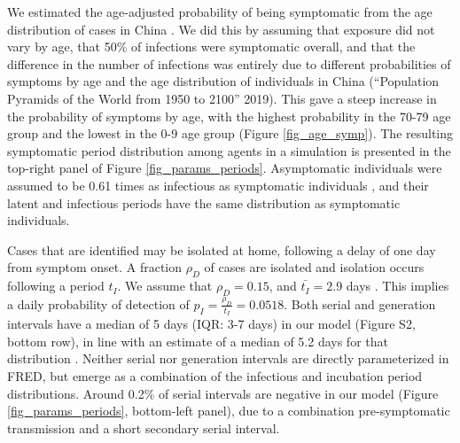 \documentclass[11pt]{article}
\begin{document}
We estimated the age-adjusted probability of being symptomatic from the age distribution of cases in China \cite{ChinaCDC2020_weekly}. We did this by assuming that exposure did not vary by age, that 50\% of infections were symptomatic overall, and that the difference in the number of infections was entirely due to different probabilities of symptoms by age and the age distribution of individuals in China (“Population Pyramids of the World from 1950 to 2100” 2019). This gave a steep increase in the probability of symptoms by age, with the highest probability in the 70-79 age group and the lowest in the 0-9 age group (Figure \ref{fig_age_symp}). The resulting symptomatic period distribution among agents in a simulation is presented in the top-right panel of Figure \ref{fig_params_periods}. Asymptomatic individuals were assumed to be 0.61 times as infectious as symptomatic individuals \cite{Perkins2020_MedRxiv}, and their latent and infectious periods have the same distribution as symptomatic individuals.

Cases that are identified may be isolated at home, following a delay of one day from symptom onset. A fraction $\rho_D$ of cases are isolated and isolation occurs following a period $t_I$. We assume that $\rho_D=0.15$, and $\bar{t_I}=2.9$ days \cite{Liu2020_NEJM,Perkins2020_MedRxiv,Russell2020_CMMID}. This implies a daily probability of detection of $p_I= \frac{\rho_D}{t_I}=0.0518$. Both serial and generation intervals have a median of 5 days (IQR: 3-7 days) in our model (Figure S2, bottom row), in line with an estimate of a median of 5.2 days for that distribution \cite{He2020_Nature}. Neither serial nor generation intervals are directly parameterized in FRED, but emerge as a combination of the infectious and incubation period distributions. Around 0.2\% of serial intervals are negative in our model (Figure \ref{fig_params_periods}, bottom-left panel), due to a combination pre-symptomatic transmission and a short secondary serial interval.
\end{document}
